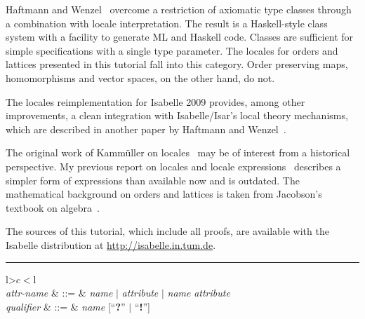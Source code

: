 \begin{isabellebody}
\begin{isamarkuptext}
  Haftmann and Wenzel~\cite{HaftmannWenzel2007} overcome a restriction
  of axiomatic type classes through a combination with locale
  interpretation.  The result is a Haskell-style class system with a
  facility to generate ML and Haskell code.  Classes are sufficient for
  simple specifications with a single type parameter.  The locales for
  orders and lattices presented in this tutorial fall into this
  category.  Order preserving maps, homomorphisms and vector spaces,
  on the other hand, do not.

  The locales reimplementation for Isabelle 2009 provides, among other
  improvements, a clean integration with Isabelle/Isar's local theory
  mechanisms, which are described in another paper by Haftmann and
  Wenzel~\cite{HaftmannWenzel2009}.

  The original work of Kamm\"uller on locales~\cite{KammullerEtAl1999}
  may be of interest from a historical perspective.  My previous
  report on locales and locale expressions~\cite{Ballarin2004a}
  describes a simpler form of expressions than available now and is
  outdated. The mathematical background on orders and lattices is
  taken from Jacobson's textbook on algebra~\cite[Chapter~8]{Jacobson1985}.

  The sources of this tutorial, which include all proofs, are
  available with the Isabelle distribution at
  \url{http://isabelle.in.tum.de}.%
\end{isamarkuptext}%
\isamarkuptrue%
%
\begin{isamarkuptext}%
\begin{table}
\hrule
\vspace{2ex}
\begin{center}
\begin{tabular}{l>$c<$l}
   \\

  \textit{attr-name} & ::=
  & \textit{name} $|$ \textit{attribute} $|$
    \textit{name} \textit{attribute} \\
  \textit{qualifier} & ::=
  & \textit{name} [``\textbf{?}'' $|$ ``\textbf{!}''] \\[2ex]

   \\


\end{tabular}
\end{center}
\end{table}
\end{isamarkuptext}
\end{isabellebody}
